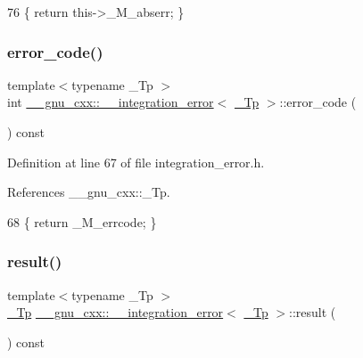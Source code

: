 \begin{DoxyCode}
76       \{ \textcolor{keywordflow}{return} this->\_M\_abserr; \}
\end{DoxyCode}
\mbox{\label{class____gnu__cxx_1_1____integration__error_a930f87a4a99140366df637260a2e5929}} 
\subsubsection{\texorpdfstring{error\+\_\+code()}{error\_code()}}
{\footnotesize\ttfamily template$<$typename \+\_\+\+Tp $>$ \\
int \hyperlink{class____gnu__cxx_1_1____integration__error}{\+\_\+\+\_\+gnu\+\_\+cxx\+::\+\_\+\+\_\+integration\+\_\+error}$<$ \hyperlink{namespace____gnu__cxx_a3b19a9c800ca194374ef9172290f7d79}{\+\_\+\+Tp} $>$\+::error\+\_\+code (\begin{DoxyParamCaption}{ }\end{DoxyParamCaption}) const\hspace{0.3cm}{\ttfamily [inline]}}



Definition at line 67 of file integration\+\_\+error.\+h.



References \+\_\+\+\_\+gnu\+\_\+cxx\+::\+\_\+\+Tp.


\begin{DoxyCode}
68       \{ \textcolor{keywordflow}{return} \_M\_errcode; \}
\end{DoxyCode}
\mbox{\label{class____gnu__cxx_1_1____integration__error_abc65cbc56e30b33859f9df92aaf8b636}} 
\subsubsection{\texorpdfstring{result()}{result()}}
{\footnotesize\ttfamily template$<$typename \+\_\+\+Tp $>$ \\
\hyperlink{namespace____gnu__cxx_a3b19a9c800ca194374ef9172290f7d79}{\+\_\+\+Tp} \hyperlink{class____gnu__cxx_1_1____integration__error}{\+\_\+\+\_\+gnu\+\_\+cxx\+::\+\_\+\+\_\+integration\+\_\+error}$<$ \hyperlink{namespace____gnu__cxx_a3b19a9c800ca194374ef9172290f7d79}{\+\_\+\+Tp} $>$\+::result (\begin{DoxyParamCaption}{ }\end{DoxyParamCaption}) const\hspace{0.3cm}{\ttfamily [inline]}}



